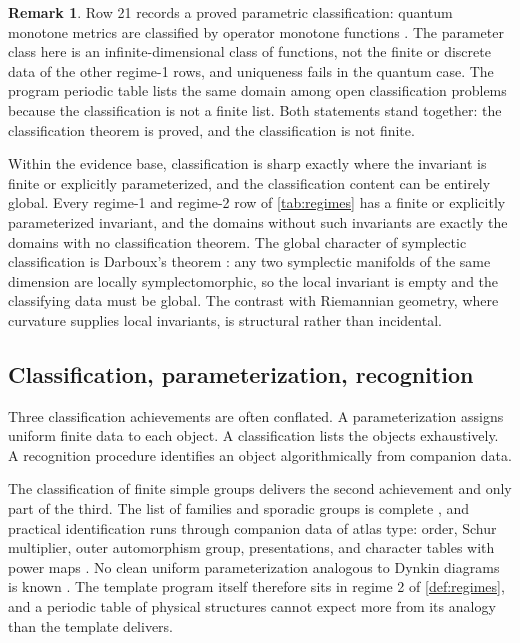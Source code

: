 \documentclass[11pt,letterpaper]{article}
\theoremstyle{definition}
\newtheorem{remark}[theorem]{Remark}
\begin{document}
\begin{remark}
Row 21 records a proved parametric classification: quantum monotone metrics are classified by operator monotone functions \cite{corpus-52}. The parameter class here is an infinite-dimensional class of functions, not the finite or discrete data of the other regime-1 rows, and uniqueness fails in the quantum case. The program periodic table lists the same domain among open classification problems because the classification is not a finite list. Both statements stand together: the classification theorem is proved, and the classification is not finite.
\end{remark}

Within the evidence base, classification is sharp exactly where the invariant is finite or explicitly parameterized, and the classification content can be entirely global. Every regime-1 and regime-2 row of \cref{tab:regimes} has a finite or explicitly parameterized invariant, and the domains without such invariants are exactly the domains with no classification theorem. The global character of symplectic classification is Darboux's theorem \cite{corpus-6}: any two symplectic manifolds of the same dimension are locally symplectomorphic, so the local invariant is empty and the classifying data must be global. The contrast with Riemannian geometry, where curvature supplies local invariants, is structural rather than incidental.

\subsection{Classification, parameterization, recognition}

Three classification achievements are often conflated. A parameterization assigns uniform finite data to each object. A classification lists the objects exhaustively. A recognition procedure identifies an object algorithmically from companion data.

The classification of finite simple groups delivers the second achievement and only part of the third. The list of families and sporadic groups is complete \cite{corpus-1,corpus-2}, and practical identification runs through companion data of atlas type: order, Schur multiplier, outer automorphism group, presentations, and character tables with power maps \cite{corpus-3}. No clean uniform parameterization analogous to Dynkin diagrams is known \cite{corpus-1}. The template program itself therefore sits in regime 2 of \cref{def:regimes}, and a periodic table of physical structures cannot expect more from its analogy than the template delivers.
\end{document}
